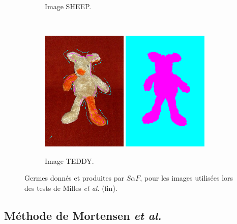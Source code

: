 \begin{figure}[htb]
\begin{subfigure}[B]{0.7\textwidth}
		 \caption{Image SHEEP.}
	\end{subfigure}	
	\\
	 \begin{subfigure}[B]{0.7\textwidth}	
			\includegraphics[width=0.45\textwidth]{images/evaluation/Milles/teddy_seeds.jpg}
			\includegraphics[width=0.45\textwidth]{images/evaluation/Milles/teddy_seg.png}
		 \caption{Image TEDDY.}
	\end{subfigure}	
	\caption{Germes donnés et  produites par $S \alpha F$, pour les images utilisées lors des tests de Milles \textit{et al.} (fin).}
	\label{fig:eval:BinC3}
\end{figure}



\subsection{Méthode de Mortensen \textit{et al.}}


